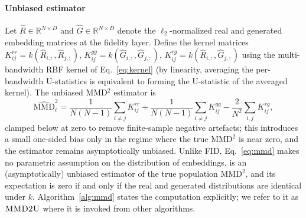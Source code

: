 \documentclass[lettersize,journal]{IEEEtran}
\begin{document}
\paragraph{Unbiased estimator}
Let $\hat{R} \in \mathbb{R}^{N \times D}$ and
$\hat{G} \in \mathbb{R}^{N \times D}$ denote the $\ell_2$-normalized
real and generated embedding matrices at the fidelity layer.
Define the kernel matrices
$K^{rr}_{ij} = k(\hat{R}_{i,:}, \hat{R}_{j,:})$,
$K^{gg}_{ij} = k(\hat{G}_{i,:}, \hat{G}_{j,:})$,
$K^{rg}_{ij} = k(\hat{R}_{i,:}, \hat{G}_{j,:})$
using the multi-bandwidth RBF kernel of Eq.~\eqref{eq:kernel}
(by linearity, averaging the per-bandwidth U-statistics is equivalent to
forming the U-statistic of the averaged kernel).
The unbiased MMD$^2$ estimator is
\begin{equation}
  \label{eq:mmd}
  \widehat{\mathrm{MMD}}^2_\ell =
  \frac{1}{N(N-1)} \!\!\sum_{i \neq j}\!\! K^{rr}_{ij}
  + \frac{1}{N(N-1)} \!\!\sum_{i \neq j}\!\! K^{gg}_{ij}
  - \frac{2}{N^2} \sum_{i,j} K^{rg}_{ij},
\end{equation}
clamped below at zero to remove finite-sample negative artefacts; this
introduces a small one-sided bias only in the regime where the true
$\mathrm{MMD}^2$ is near zero, and the estimator remains asymptotically
unbiased.
Unlike FID, Eq.~\eqref{eq:mmd} makes no parametric assumption on the
distribution of embeddings, is an (asymptotically) unbiased estimator of the true
population $\mathrm{MMD}^2$, and its expectation is zero if and only if
the real and generated distributions are identical under $k$.
Algorithm~\ref{alg:mmd} states the computation explicitly; we refer to it as
$\textsc{MMD2U}$ where it is invoked from other algorithms.
\end{document}
